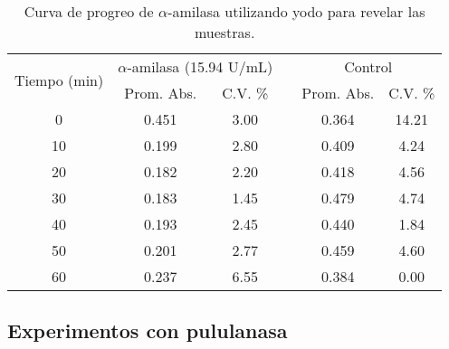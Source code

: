 \documentclass{article}
\begin{document}
\begin{table}[H]
	\centering
	\caption{Curva de progreo de $\alpha$-amilasa utilizando yodo para revelar las muestras.}
	\begin{tabular}{cccccc}
		\toprule
		\multirow{2}[4]{*}{Tiempo (min)} & \multicolumn{2}{c}{ $\alpha$-amilasa (15.94 U/mL)} &       & \multicolumn{2}{c}{Control} \\
		\cmidrule{2-3}\cmidrule{5-6}          & Prom. Abs. & C.V. \% &       & Prom. Abs. & C.V. \% \\
		\midrule
		0     & 0.451 & 3.00  &       & 0.364 & 14.21 \\
		10    & 0.199 & 2.80  &       & 0.409 & 4.24 \\
		20    & 0.182 & 2.20  &       & 0.418 & 4.56 \\
		30    & 0.183 & 1.45  &       & 0.479 & 4.74 \\
		40    & 0.193 & 2.45  &       & 0.440 & 1.84 \\
		50    & 0.201 & 2.77  &       & 0.459 & 4.60 \\
		60    & 0.237 & 6.55  &       & 0.384 & 0.00 \\
		\bottomrule
	\end{tabular}%
	\label{tab:a5}%
\end{table}%


\subsection{ Experimentos con pululanasa}
\end{document}

